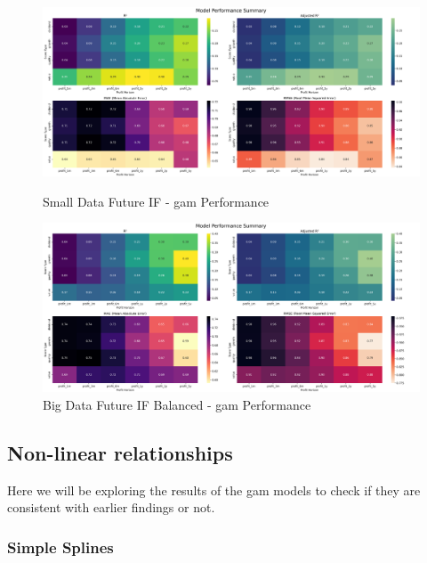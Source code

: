 \documentclass[11pt,english,a4paper,hidelinks]{book}
\begin{document}
\begin{figure}[H]
    \centering
    \begin{minipage}{0.48\textwidth}
        \centering
        \includegraphics[width=1\textwidth]{images/code/models/general_regression/Small Data future - IF performance.png}
        \caption{Small Data Future IF - \acrshort{gam} Performance}
        \label{fig:gam_small_performance}
    \end{minipage}\hfill
    \begin{minipage}{0.48\textwidth}
        \centering
        \includegraphics[width=1\textwidth]{images/code/models/general_regression/Big Data future - IF HARD Balanced performance.png}
        \caption{Big Data Future IF Balanced - \acrshort{gam} Performance}
        \label{fig:gam_balanced_performance}
    \end{minipage}
\end{figure}

\subsection{Non-linear relationships}

\noindent Here we will be exploring the results of the \acrshort{gam} models to check if they are consistent with earlier findings or not.

\subsubsection{Simple Splines}
\end{document}
